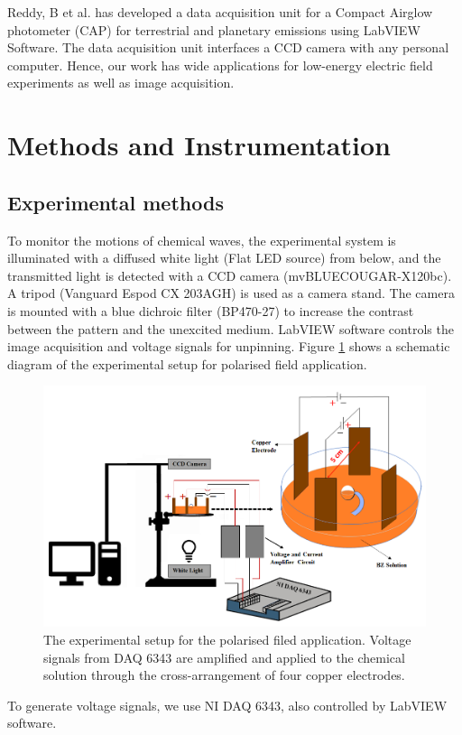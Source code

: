 \documentclass[journal=jacsat,manuscript=article]{achemso}
\begin{document}
Reddy, B et al. \cite{reddy2015development} has developed a data acquisition unit for a Compact Airglow photometer (CAP) for terrestrial and planetary emissions using LabVIEW Software. The data acquisition unit interfaces a CCD camera with any personal computer. 
Hence, our work has wide applications for low-energy electric field experiments as well as image acquisition.  
\section{Methods and Instrumentation}
\subsection{Experimental methods}
To monitor the motions of chemical waves, the experimental system is illuminated with a diffused white light (Flat LED source) from below, and the transmitted light is detected with a CCD camera (mvBLUECOUGAR-X120bc). A tripod (Vanguard Espod CX 203AGH) is used as a camera stand. The camera is mounted with a blue dichroic filter (BP470-27) to increase the contrast between the pattern and the unexcited medium. 
LabVIEW software controls the image acquisition and voltage signals for unpinning. Figure \ref{fig:ex1} shows a schematic diagram of the experimental setup for polarised field application.
\begin{figure}[H]
    \centering
    \includegraphics[width=\linewidth]{experiment_setup_01.png}
    \caption{The experimental setup for the polarised filed application. Voltage  signals from DAQ 6343 are amplified and applied to the chemical solution through the cross-arrangement of four copper electrodes. }
    \label{fig:ex1}
\end{figure}
To generate voltage signals, we use NI DAQ 6343, also controlled by LabVIEW software. 
\end{document}
